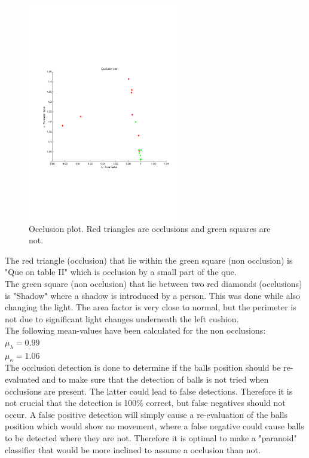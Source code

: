 \begin{figure}[H]
\begin{center}
\leavevmode
\includegraphics[width=0.6\textwidth]{images/occlusion_plot}
\end{center}
\caption{Occlusion plot. Red triangles are occlusions and green squares are not.}
\label{fig:occlusion_plot}
\end{figure}

The red triangle (occlusion) that lie within the green square (non occlusion) is "Que on table II" which is occlusion by a small part of the que.\\

The green square (non occlusion) that lie between two red diamonds (occlusions) is "Shadow" where a shadow is introduced by a person. This was done while also changing the light. The area factor is very close to normal, but the perimeter is not due to significant light changes underneath the left cushion.\\

The following mean-values have been calculated for the non occlusions:\\

$\mu_{\lambda} = 0.99$\\
$\mu_{\kappa} = 1.06$\\

The occlusion detection is done to determine if the balls position should be re-evaluated and to make sure that the detection of balls is not tried when occlusions are present. The latter could lead to false detections. Therefore it is not crucial that the detection is 100\% correct, but false negatives should not occur. A false positive detection will simply cause a re-evaluation of the balls position which would show no movement, where a false negative could cause balls to be detected where they are not. Therefore it is optimal to make a "paranoid" classifier that would be more inclined to assume a occlusion than not.\\

